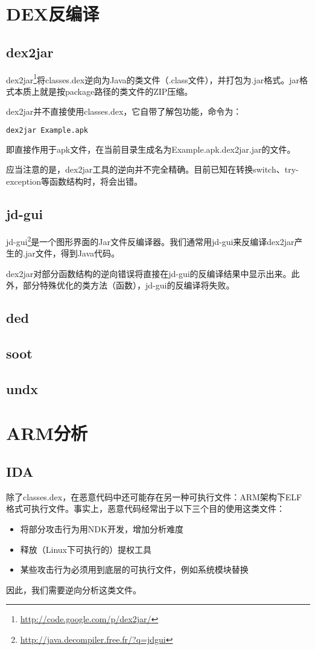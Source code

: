 \section{DEX反编译}
\subsection{dex2jar}
dex2jar\footnote{\url{http://code.google.com/p/dex2jar/}}将classes.dex逆向为Java的类文件（.class文件），并打包为.jar格式。jar格式本质上就是按package路径的类文件的ZIP压缩。

dex2jar并不直接使用classes.dex，它自带了解包功能，命令为：
\begin{lstlisting}[language=bash, numbers=none]
dex2jar Example.apk
\end{lstlisting}
即直接作用于apk文件，在当前目录生成名为Example.apk.dex2jar.jar的文件。

应当注意的是，dex2jar工具的逆向并不完全精确。目前已知在转换switch、try-exception等函数结构时，将会出错。
\subsection{jd-gui}
jd-gui\footnote{\url{http://java.decompiler.free.fr/?q=jdgui}}是一个图形界面的Jar文件反编译器。我们通常用jd-gui来反编译dex2jar产生的.jar文件，得到Java代码。

dex2jar对部分函数结构的逆向错误将直接在jd-gui的反编译结果中显示出来。此外，部分特殊优化的类方法（函数），jd-gui的反编译将失败。
\subsection{ded}
\subsection{soot}
\subsection{undx}

\section{ARM分析}
\subsection{IDA}
除了classes.dex，在恶意代码中还可能存在另一种可执行文件：ARM架构下ELF格式可执行文件。事实上，恶意代码经常出于以下三个目的使用这类文件：
\begin{itemize}
	\item 将部分攻击行为用NDK开发，增加分析难度
	\item 释放（Linux下可执行的）提权工具
	\item 某些攻击行为必须用到底层的可执行文件，例如系统模块替换
\end{itemize}
因此，我们需要逆向分析这类文件。

